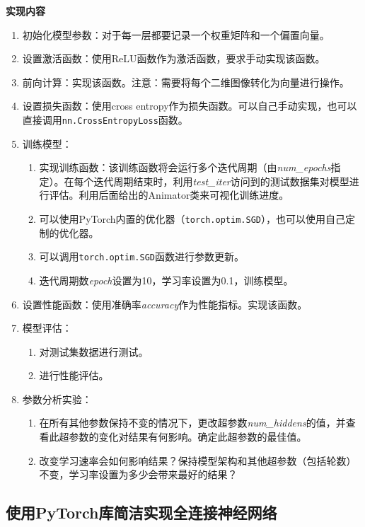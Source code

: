 \documentclass[12pt]{article}
\begin{document}
\textbf{实现内容}
\begin{enumerate}
  \item 初始化模型参数：对于每一层都要记录一个权重矩阵和一个偏置向量。
  \item 设置激活函数：使用ReLU函数作为激活函数，要求手动实现该函数。
  \item 前向计算：实现该函数。注意：需要将每个二维图像转化为向量进行操作。
  \item 设置损失函数：使用cross entropy作为损失函数。可以自己手动实现，也可以直接调用\texttt{nn.CrossEntropyLoss}函数。
  \item 训练模型：
        \begin{enumerate}
          \item 实现训练函数：该训练函数将会运行多个迭代周期（由\textit{num\_epochs}指定）。在每个迭代周期结束时，利用\textit{test\_iter}访问到的测试数据集对模型进行评估。利用后面给出的Animator类来可视化训练进度。
          \item 可以使用PyTorch内置的优化器（\texttt{torch.optim.SGD}），也可以使用自己定制的优化器。
          \item 可以调用\texttt{torch.optim.SGD}函数进行参数更新。
          \item 迭代周期数\textit{epoch}设置为10，学习率设置为0.1，训练模型。
        \end{enumerate}
  \item 设置性能函数：使用准确率\textit{accuracy}作为性能指标。实现该函数。
  \item 模型评估：
        \begin{enumerate}
          \item 对测试集数据进行测试。
          \item 进行性能评估。
        \end{enumerate}
  \item 参数分析实验：
        \begin{enumerate}
          \item 在所有其他参数保持不变的情况下，更改超参数\textit{num\_hiddens}的值，并查看此超参数的变化对结果有何影响。确定此超参数的最佳值。
          \item 改变学习速率会如何影响结果？保持模型架构和其他超参数（包括轮数）不变，学习率设置为多少会带来最好的结果？
        \end{enumerate}
\end{enumerate}

\subsection{使用PyTorch库简洁实现全连接神经网络}
\end{document}
